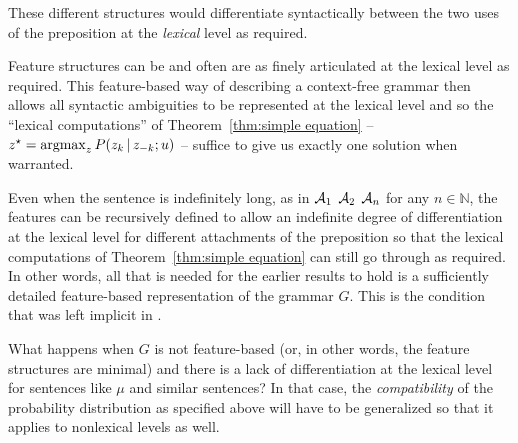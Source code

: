 \noindent These different structures would differentiate syntactically between the two uses of the preposition at the \emph{lexical} level as required.

Feature structures can be and often are as finely articulated at the lexical level as required. This feature-based way of describing a context-free grammar then allows all syntactic ambiguities to be represented at the lexical level and so the ``lexical computations'' of Theorem~\ref{thm:simple equation} -- $z^\star = \operatorname*{argmax}_{z} P(z_k \,|\, z_{-k}; u)$ -- suffice to give us exactly one solution when warranted.

Even when the sentence is indefinitely long, as in ${\cal A}_1$  ${\cal A}_2$  ${\cal A}_n$  for any $n \in \mathbb{N}$, the features can be recursively defined to allow an indefinite degree of differentiation at the lexical level for different attachments of the preposition  so that the lexical computations of Theorem~\ref{thm:simple equation} can still go through as required. In other words, all that is needed for the earlier results to hold is a sufficiently detailed feature-based representation of the grammar $G$. This is the condition that was left implicit in .

What happens when $G$ is not feature-based (or, in other words, the feature structures are minimal) and there is a lack of differentiation at the lexical level for sentences like $\mu$ and similar sentences? In that case, the \emph{compatibility} of the probability distribution as specified above will have to be generalized so that it applies to nonlexical levels as well.

